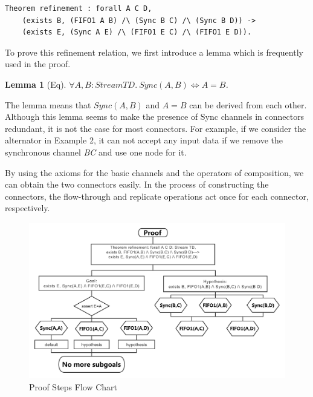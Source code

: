 \documentclass[preprint,3p]{elsarticle}
\newtheorem{lemma}{Lemma}[section]
\begin{document}
\begin{lstlisting}[language=coq]
Theorem refinement : forall A C D,
    (exists B, (FIFO1 A B) /\ (Sync B C) /\ (Sync B D)) ->
    (exists E, (Sync A E) /\ (FIFO1 E C) /\ (FIFO1 E D)).
\end{lstlisting}



To prove this refinement relation, we first introduce a lemma which is frequently used in the proof.
\begin{lemma}[Eq]\label{lemma:eq}
$\forall A,B: Stream TD.\:Sync (A,B) \Leftrightarrow A = B$.
\end{lemma}
The lemma means that $Sync(A, B)$ and $A=B$ can be derived
from each other. Although this lemma seems to make the presence of
Sync channels in connectors redundant, it is not the case for most
connectors. For example, if we consider
the alternator in Example 2, it can not accept any input data if we
remove the synchronous channel \emph{BC} and use one node for it.

By using the axioms for the basic channels and the operators of composition, we can obtain the two connectors easily.
In the process of constructing the connectors, the flow-through and replicate operations act once for each connector, respectively.


\begin{figure}[htbp]
\centering
\includegraphics[width=11.5cm]{Refinement.pdf}
\caption{Proof Steps Flow Chart}
\label{fig:equivalence}
\end{figure}
\end{document}
